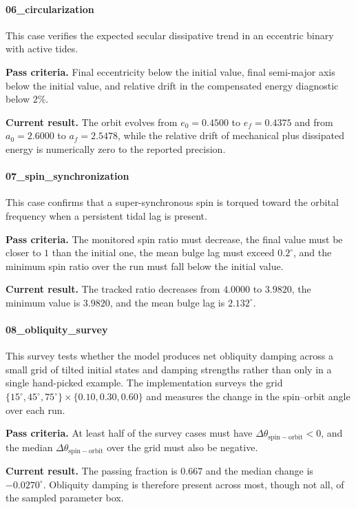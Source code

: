 \documentclass[journal, a4paper]{IEEEtran}
\begin{document}
\paragraph{06\_circularization}
This case verifies the expected secular dissipative trend in an eccentric
binary with active tides.
\par\smallskip
\textbf{Pass criteria.} Final eccentricity below the initial value, final
semi-major axis below the initial value, and relative drift in the compensated
energy diagnostic below $2\%$.
\par\smallskip
\textbf{Current result.} The orbit evolves from $e_0=0.4500$ to
$e_f=0.4375$ and from $a_0=2.6000$ to $a_f=2.5478$, while the relative drift of
mechanical plus dissipated energy is numerically zero to the reported
precision.

\paragraph{07\_spin\_synchronization}
This case confirms that a super-synchronous spin is torqued toward the orbital
frequency when a persistent tidal lag is present.
\par\smallskip
\textbf{Pass criteria.} The monitored spin ratio must decrease, the final
value must be closer to $1$ than the initial one, the mean bulge lag must
exceed $0.2^\circ$, and the minimum spin ratio over the run must fall below the
initial value.
\par\smallskip
\textbf{Current result.} The tracked ratio decreases from $4.0000$ to
$3.9820$, the minimum value is $3.9820$, and the mean bulge lag is
$2.132^\circ$.

\paragraph{08\_obliquity\_survey}
This survey tests whether the model produces net obliquity damping across a
small grid of tilted initial states and damping strengths rather than only in a
single hand-picked example. The implementation surveys the grid
$\{15^\circ,45^\circ,75^\circ\}\times\{0.10,0.30,0.60\}$ and measures the
change in the spin--orbit angle over each run.
\par\smallskip
\textbf{Pass criteria.} At least half of the survey cases must have
$\Delta\theta_{\mathrm{spin-orbit}}<0$, and the median
$\Delta\theta_{\mathrm{spin-orbit}}$ over the grid must also be negative.
\par\smallskip
\textbf{Current result.} The passing fraction is $0.667$ and the median change
is $-0.0270^\circ$. Obliquity damping is therefore present across most, though not
all, of the sampled parameter box.
\end{document}
